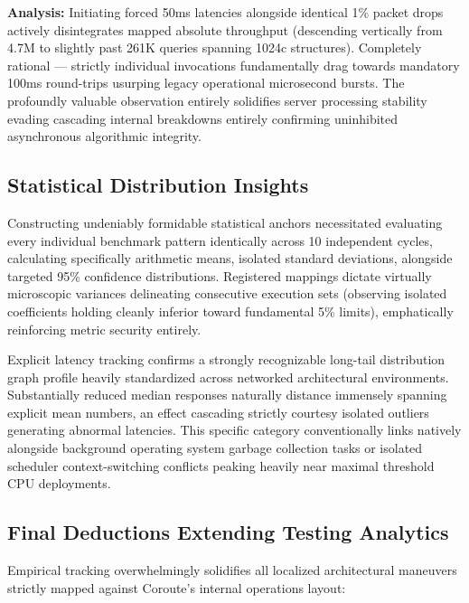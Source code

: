 \textbf{Analysis:} Initiating forced 50ms latencies alongside identical 1\% packet drops actively disintegrates mapped absolute throughput (descending vertically from 4.7M to slightly past 261K queries spanning 1024c structures). Completely rational --- strictly individual invocations fundamentally drag towards mandatory 100ms round-trips usurping legacy operational microsecond bursts. The profoundly valuable observation entirely solidifies server processing stability evading cascading internal breakdowns entirely confirming uninhibited asynchronous algorithmic integrity.

\subsection{Statistical Distribution Insights}

Constructing undeniably formidable statistical anchors necessitated evaluating every individual benchmark pattern identically across 10 independent cycles, calculating specifically arithmetic means, isolated standard deviations, alongside targeted 95\% confidence distributions. Registered mappings dictate virtually microscopic variances delineating consecutive execution sets (observing isolated coefficients holding cleanly inferior toward fundamental 5\% limits), emphatically reinforcing metric security entirely.

Explicit latency tracking confirms a strongly recognizable long-tail distribution graph profile heavily standardized across networked architectural environments. Substantially reduced median responses naturally distance immensely spanning explicit mean numbers, an effect cascading strictly courtesy isolated outliers generating abnormal latencies. This specific category conventionally links natively alongside background operating system garbage collection tasks or isolated scheduler context-switching conflicts peaking heavily near maximal threshold CPU deployments.

\subsection{Final Deductions Extending Testing Analytics}

Empirical tracking overwhelmingly solidifies all localized architectural maneuvers strictly mapped against Coroute's internal operations layout:

